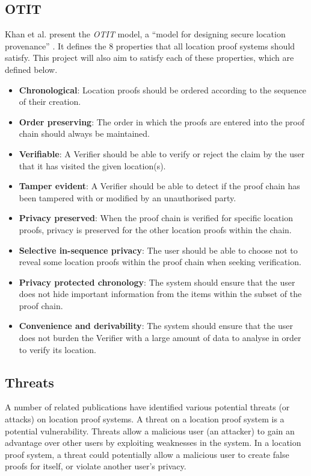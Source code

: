 \subsection{OTIT} \label{ssec:otit}
Khan et al. present the \textit{OTIT} model, a ``model for designing secure location provenance'' \cite{otit}. It defines the 8 properties that all location proof systems should satisfy. This project will also aim to satisfy each of these properties, which are defined below.
\begin{itemize}
	\item[] \textbf{Chronological}: Location proofs should be ordered according to the sequence of their creation.
	\item[] \textbf{Order preserving}: The order in which the proofs are entered into the proof chain should always be maintained.
	\item[] \textbf{Verifiable}: A Verifier should be able to verify or reject the claim by the user that it has visited the given location(s).
	\item[] \textbf{Tamper evident}: A Verifier should be able to detect if the proof chain has been tampered with or modified by an unauthorised party.
	\item[] \textbf{Privacy preserved}: When the proof chain is verified for specific location proofs, privacy is preserved for the other location proofs within the chain.
	\item[] \textbf{Selective in-sequence privacy}: The user should be able to choose not to reveal some location proofs within the proof chain when seeking verification.
	\item[] \textbf{Privacy protected chronology}: The system should ensure that the user does not hide important information from the items within the subset of the proof chain.
	\item[] \textbf{Convenience and derivability}: The system should ensure that the user does not burden the Verifier with a large amount of data to analyse in order to verify its location.
\end{itemize}

\subsection{Threats} \label{ssec:threats}
A number of related publications \cite{luo,khan} have identified various potential threats (or attacks) on location proof systems. A threat on a location proof system is a potential vulnerability. Threats allow a malicious user (an attacker) to gain an advantage over other users by exploiting weaknesses in the system. In a location proof system, a threat could potentially allow a malicious user to create false proofs for itself, or violate another user's privacy.


